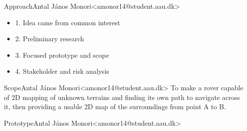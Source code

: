 \begin{frame}{Approach}{Antal János Monori\newline<amonor14@student.aau.dk>}
	\begin{itemize}
		\item <2-> 1. Idea came from common interest
		\item <3-> 2. Preliminary research
		\item <4-> 3. Focused prototype and scope
		\item <5-> 4. Stakeholder and risk analysis
	\end{itemize}
\end{frame}

\begin{frame}{Scope}{Antal János Monori\newline<amonor14@student.aau.dk>}
	To make a rover capable of 2D mapping of unknown terrains and finding its own path to navigate across it, then providing a usable 2D map of the surroundings from point A to B.
\end{frame}

\begin{frame}{Prototype}{Antal János Monori\newline<amonor14@student.aau.dk>}
	\begin{figure}[h!]
	\end{figure}
\end{frame}

